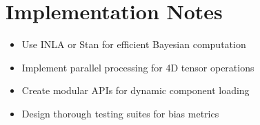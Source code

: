 \documentclass[11pt,a4paper]{article}
\begin{document}
\section{Implementation Notes}

\begin{itemize}
    \item Use INLA or Stan for efficient Bayesian computation
    \item Implement parallel processing for 4D tensor operations
    \item Create modular APIs for dynamic component loading
    \item Design thorough testing suites for bias metrics
\end{itemize}
\end{document}
